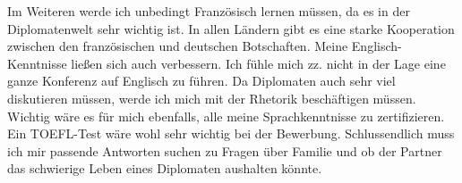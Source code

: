 \documentclass{../../sem_paper}
\begin{document}
Im Weiteren werde ich unbedingt Französisch lernen müssen, da es in der Diplomatenwelt sehr wichtig ist. In allen Ländern gibt es eine starke Kooperation zwischen den französischen und deutschen Botschaften. Meine Englisch-Kenntnisse ließen sich auch verbessern. Ich fühle mich zz. nicht in der Lage eine ganze Konferenz auf Englisch zu führen. Da Diplomaten auch sehr viel diskutieren müssen, werde ich mich mit der Rhetorik beschäftigen müssen. Wichtig wäre es für mich ebenfalls, alle meine Sprachkenntnisse zu zertifizieren. Ein TOEFL-Test wäre wohl sehr wichtig bei der Bewerbung. Schlussendlich muss ich mir passende Antworten suchen zu Fragen über Familie und ob der Partner das schwierige Leben eines Diplomaten aushalten könnte.
\end{document}
